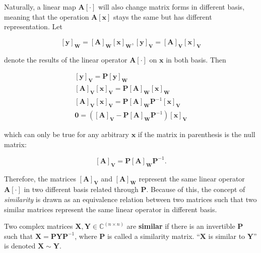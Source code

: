 	Naturally, a linear map $\mathbf{A}\left[\cdot\right]$ will also change matrix forms in different basis, meaning that the operation $\mathbf{A}\left[\mathbf{x}\right]$ stays the same but has different representation. Let

\begin{equation} \left[\mathbf{y}\right]_\mathbf{W} = \left[\mathbf{A}\right]_\mathbf{W} \left[\mathbf{x}\right]_\mathbf{W}, \left[\mathbf{y}\right]_\mathbf{V} = \left[\mathbf{A}\right]_\mathbf{V} \left[\mathbf{x}\right]_\mathbf{V} \end{equation}

	\noindent denote the results of the linear operator $\mathbf{A}\left[\cdot\right]$ on $\mathbf{x}$ in both basis. Then

\begin{gather}
	\left[\mathbf{y}\right]_\mathbf{V} = \mathbf{P}\left[\mathbf{y}\right]_\mathbf{W} \nonumber\\[5mm]
	\left[\mathbf{A}\right]_\mathbf{V}\left[\mathbf{x}\right]_\mathbf{V} = \mathbf{P}\left[\mathbf{A}\right]_\mathbf{W}\left[\mathbf{x}\right]_\mathbf{W} \nonumber\\[5mm]
	\left[\mathbf{A}\right]_\mathbf{V}\left[\mathbf{x}\right]_\mathbf{V} = \mathbf{P}\left[\mathbf{A}\right]_\mathbf{W} \mathbf{P}^{-1} \left[\mathbf{x}\right]_\mathbf{V} \nonumber\\[5mm]
	\mathbf{0} = \left(\left[\mathbf{A}\right]_\mathbf{V} - \mathbf{P}\left[\mathbf{A}\right]_\mathbf{W} \mathbf{P}^{-1}\right) \left[\mathbf{x}\right]_\mathbf{V}
\end{gather}

	\noindent which can only be true for any arbitrary $\mathbf{x}$ if the matrix in parenthesis is the null matrix:

\begin{equation} \left[\mathbf{A}\right]_\mathbf{V} = \mathbf{P}\left[\mathbf{A}\right]_\mathbf{W} \mathbf{P}^{-1}. \end{equation}

	Therefore, the matrices $\left[\mathbf{A}\right]_\mathbf{V}$ and $\left[\mathbf{A}\right]_\mathbf{W}$ represent the same linear operator $\mathbf{A}\left[\cdot\right]$ in two different basis related through $\mathbf{P}$. Because of this, the concept of \textit{similarity} is drawn as an equivalence relation between two matrices such that two similar matrices represent the same linear operator in different basis.

\begin{definition} \label{def:matrix_similarity}
	Two complex matrices $\mathbf{X,Y}\in\mathbb{C}^{\left(n\times n\right)}$ are \textbf{similar} if there is an invertible $\mathbf{P}$ such that $\mathbf{X} = \mathbf{PYP}^{-1}$, where $\mathbf{P}$ is called a similarity matrix. ``$\mathbf{X}$ is similar to $\mathbf{Y}$'' is  denoted $\mathbf{X}\sim\mathbf{Y}$.
\end{definition}

